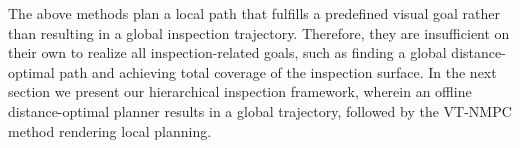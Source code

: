\documentclass[letterpaper, 10 pt, conference]{ieeeconf}  %
\begin{document}

The above methods plan a local path that fulfills a predefined visual goal rather than resulting in a global inspection trajectory. Therefore, they are insufficient on their own to realize all inspection-related goals, such as finding a global distance-optimal path and achieving total coverage of the inspection surface. In the next section we present our hierarchical inspection framework, wherein an offline distance-optimal planner results in a global trajectory, followed by the VT-NMPC method rendering local planning. %
\end{document}
